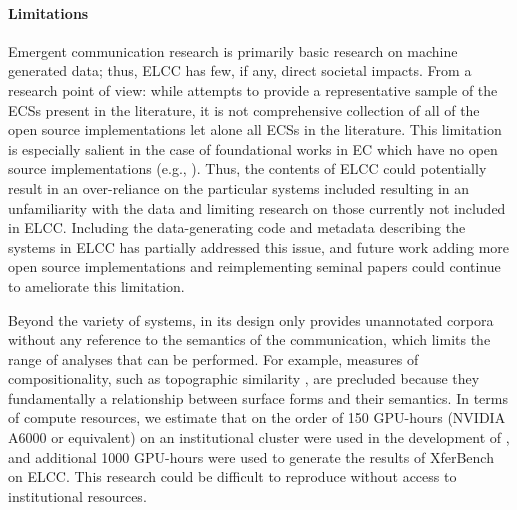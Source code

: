 \paragraph{Limitations}
Emergent communication research is primarily basic research on machine generated data; thus, ELCC has few, if any, direct societal impacts.
From a research point of view:
  while \theLib{} attempts to provide a representative sample of the ECSs present in the literature, it is not comprehensive collection of all of the open source implementations let alone all ECSs in the literature.
This limitation is especially salient in the case of foundational works in EC which have no open source implementations (e.g., \citet{mordatch2018grounded}).
Thus, the contents of ELCC could potentially result in an over-reliance on the particular systems included resulting in an unfamiliarity with the data and limiting research on those currently not included in ELCC\@.
Including the data-generating code and metadata describing the systems in ELCC has partially addressed this issue, and future work adding more open source implementations and reimplementing seminal papers could continue to ameliorate this limitation.

Beyond the variety of systems, in its design \theLib{} only provides unannotated corpora without any reference to the semantics of the communication, which limits the range of analyses that can be performed.
For example, measures of compositionality, such as topographic similarity \citep{brighton2006UnderstandingLE,lazaridou2018referential}, are precluded because they fundamentally a relationship between surface forms and their semantics.
In terms of compute resources, we estimate that on the order of 150 GPU-hours (NVIDIA A6000 or equivalent) on an institutional cluster were used in the development of \theLib{}, and additional 1000 GPU-hours were used to generate the results of XferBench on ELCC\@.
This research could be difficult to reproduce without access to institutional resources.


% 




